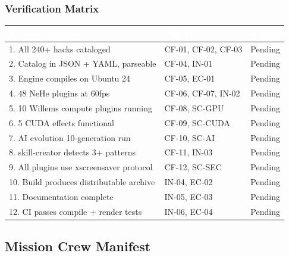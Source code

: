 \documentclass[11pt,letterpaper]{article}
\newcommand{\tableheader}[1]{\textbf{\sffamily\textcolor{white}{#1}}}
\begin{document}
\subsubsection{Verification Matrix}

\begin{center}
\begin{tabularx}{\textwidth}{XL{3.5cm}C{1.5cm}}
\toprule
{}
\tableheader{Success Criterion} & \tableheader{Test ID(s)} & \tableheader{Status} \\
. All 240+ hacks cataloged & CF-01, CF-02, CF-03 & Pending \\
2. Catalog in JSON + YAML, parseable & CF-04, IN-01 & Pending \\
3. Engine compiles on Ubuntu 24 & CF-05, EC-01 & Pending \\
4. 48 NeHe plugins at 60fps & CF-06, CF-07, IN-02 & Pending \\
5. 10 Willems compute plugins running & CF-08, SC-GPU & Pending \\
6. 5 CUDA effects functional & CF-09, SC-CUDA & Pending \\
7. AI evolution 10-generation run & CF-10, SC-AI & Pending \\
8. skill-creator detects 3+ patterns & CF-11, IN-03 & Pending \\
9. All plugins use xscreensaver protocol & CF-12, SC-SEC & Pending \\
10. Build produces distributable archive & IN-04, EC-02 & Pending \\
11. Documentation complete & IN-05, EC-03 & Pending \\
12. CI passes compile + render tests & IN-06, EC-04 & Pending \\
\bottomrule
\end{tabularx}
\end{center}

\subsection{Mission Crew Manifest}
\end{document}
